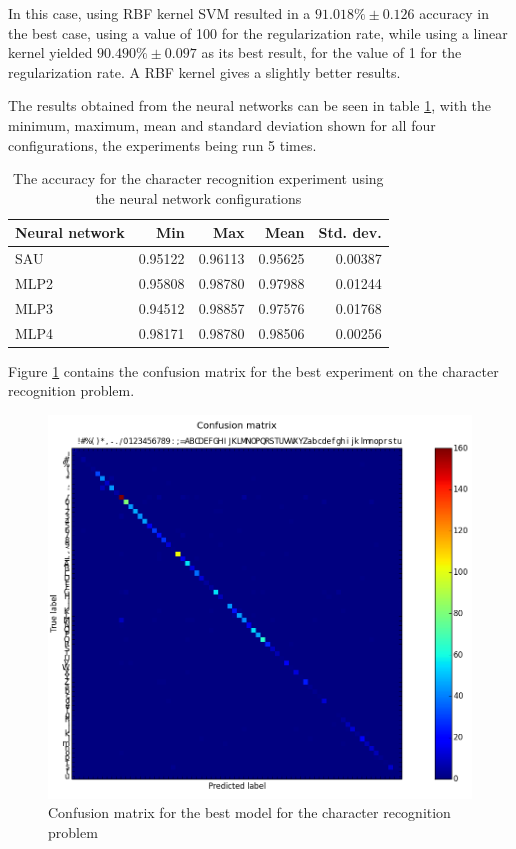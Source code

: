 In this case, using RBF kernel SVM resulted in a $ 91.018\% \pm 0.126 $ accuracy in the best case, using a value of 100 for the regularization rate, while using a linear kernel yielded $ 90.490\% \pm 0.097 $ as its best result, for the value of 1 for the regularization rate. A RBF kernel gives a slightly better results.

The results obtained from the neural networks can be seen in table \ref{table:nn_table}, with the minimum, maximum, mean and standard deviation shown for all four configurations, the experiments being run 5 times. 

\begin{table}[h]
\caption{The accuracy for the character recognition experiment using the neural network configurations}
\label{table:nn_table}
\begin{tabular}{lrrrr}
\toprule
Neural network & Min     & Max     & Mean    & Std. dev. \\ 
\midrule
SAU & 0.95122 & 0.96113 & 0.95625 & 0.00387 \\ 
MLP2 & 0.95808 & 0.98780 & 0.97988 & 0.01244 \\ 
MLP3 & 0.94512 & 0.98857 & 0.97576 & 0.01768 \\ 
MLP4 & 0.98171 & 0.98780 & 0.98506 & 0.00256 \\ 
\bottomrule
\end{tabular}
\end{table}

Figure \ref{fig:conf_matrix} contains the confusion matrix for the best experiment on the character recognition problem.


\begin{figure}[h!]
\begin{center}
\includegraphics[width=0.8\linewidth]{img/rec_cm.png}
\caption{\label{fig:conf_matrix}
Confusion matrix for the best model for the character recognition problem}
\end{center}
\end{figure}

